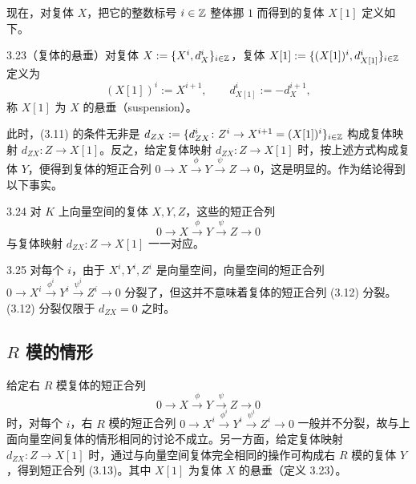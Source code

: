 现在，对复体 $X$，把它的整数标号 $i\in\mathbb{Z}$ 整体挪 $1$ 而得到的复体 $X[1]$ 定义如下。

\begin{definition}{3.23}（复体的悬垂）对复体 $X:=\{X^i,d_X^i\}_{i\in\mathbb{Z}}$，复体 $X[1]:=\{(X[1])^i,d_{X[1]}^i\}_{i\in\mathbb{Z}}$ 定义为
\[
(X[1])^i:=X^{i+1},\qquad d_{X[1]}^i:=-d_X^{i+1},
\]
称 $X[1]$ 为 $X$ 的悬垂（suspension）。
\end{definition}


此时，(3.11) 的条件无非是 $d_{ZX}:=\{d_{ZX}^i\colon Z^i\to X^{i+1}=(X[1])^i\}_{i\in\mathbb{Z}}$ 构成复体映射 $d_{ZX}\colon Z\to X[1]$。反之，给定复体映射 $d_{ZX}\colon Z\to X[1]$ 时，按上述方式构成复体 $Y$，便得到复体的短正合列 $0\to X\xrightarrow{\phi}Y\xrightarrow{\psi}Z\to 0$，这是明显的。作为结论得到以下事实。

\begin{proposition}{3.24}
对 $K$ 上向量空间的复体 $X,Y,Z$，这些的短正合列
\begin{equation}
0\to X\xrightarrow{\phi}Y\xrightarrow{\psi}Z\to 0 \tag{3.12}
\end{equation}
与复体映射 $d_{ZX}\colon Z\to X[1]$ 一一对应。
\end{proposition}

\begin{remark}{3.25} 对每个 $i$，由于 $X^i,Y^i,Z^i$ 是向量空间，向量空间的短正合列 $0\to X^i\xrightarrow{\phi^i}Y^i\xrightarrow{\psi^i}Z^i\to 0$ 分裂了，但这并不意味着复体的短正合列 (3.12) 分裂。(3.12) 分裂仅限于 $d_{ZX}=0$ 之时。
\end{remark}

\subsection{$R$ 模的情形}

给定右 $R$ 模复体的短正合列
\begin{equation}
0\to X\xrightarrow{\phi}Y\xrightarrow{\psi}Z\to 0 \tag{3.13}
\end{equation}
时，对每个 $i$，右 $R$ 模的短正合列 $0\to X^i\xrightarrow{\phi^i}Y^i\xrightarrow{\psi^i}Z^i\to 0$ 一般并不分裂，故与上面向量空间复体的情形相同的讨论不成立。另一方面，给定复体映射 $d_{ZX}\colon Z\to X[1]$ 时，通过与向量空间复体完全相同的操作可构成右 $R$ 模的复体 $Y$，得到短正合列 (3.13)。其中 $X[1]$ 为复体 $X$ 的悬垂（定义 3.23）。

